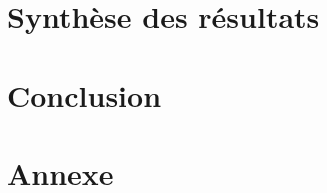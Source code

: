 \documentclass[11pt]{article}
\begin{document}
\cleardoublepage



\section{Synthèse des résultats}

\cleardoublepage


\section{Conclusion}
\cleardoublepage



\section{Annexe}


\cleardoublepage
\end{document}
